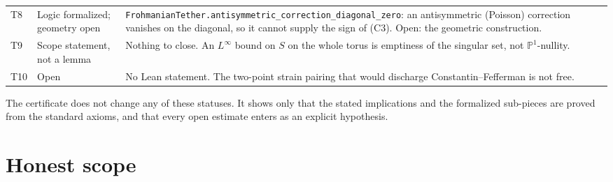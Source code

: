 \documentclass[11pt]{article}
\theoremstyle{plain}
\theoremstyle{definition}
\theoremstyle{remark}
\newcommand{\lean}[1]{\nolinkurl{#1}}
\begin{document}
\begin{center}
\begin{tabularx}{\linewidth}{@{}>{\raggedright\arraybackslash}p{0.38in}>{\raggedright\arraybackslash}p{1.25in}>{\raggedright\arraybackslash}X@{}}
T8 & Logic formalized; geometry open & \lean{FrohmanianTether.antisymmetric_correction_diagonal_zero}: an antisymmetric (Poisson) correction vanishes on the diagonal, so it cannot supply the sign of (C3). Open: the geometric construction. \\
T9 & Scope statement, not a lemma & Nothing to close. An \(L^{\infty}\) bound on \(S\) on the whole torus is emptiness of the singular set, not \(\mathbb{P}^{1}\)-nullity. \\
T10 & Open & No Lean statement. The two-point strain pairing that would discharge Constantin--Fefferman is not free. \\
\bottomrule
\end{tabularx}
\end{center}

The certificate does not change any of these statuses. It shows only that the stated implications and the formalized sub-pieces are proved from the standard axioms, and that every open estimate enters as an explicit hypothesis.

\section{Honest scope}
\end{document}
